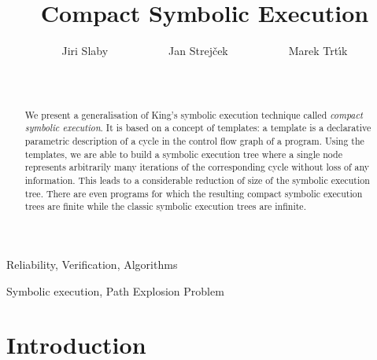 \documentclass{sig-alternate}%
\begin{document}


\title{
  Compact Symbolic Execution
}

\author{
\alignauthor
  Jiri Slaby~~~~~~~~~~~Jan Strej\v{c}ek~~~~~~~~~~~Marek Trt\'{\i}k\\
  \\
  \\
}

\maketitle

\begin{abstract}
  We present a generalisation of King's symbolic execution technique called
  \emph{compact symbolic execution}. It is based on a concept of templates:
  a template is a declarative parametric description of a cycle in the
  control flow graph of a program. 
  Using the templates, we are able to build a symbolic execution tree where
  a single node represents arbitrarily many iterations of the corresponding
  cycle without loss of any information. This leads to a considerable
  reduction of size of the symbolic execution tree. There are even programs
  for which the resulting compact symbolic execution trees are finite while
  the classic symbolic execution trees are infinite.
\end{abstract}


\terms
Reliability, Verification, Algorithms

\keywords
Symbolic execution, Path Explosion Problem


\section{Introduction} \label{sec:Introduction}
\end{document}
